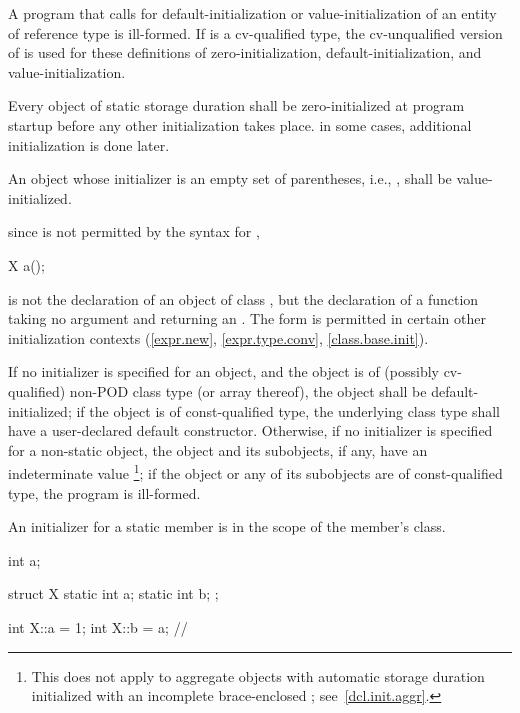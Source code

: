 A program that calls for default-initialization
or value-initialization
of an entity
of reference type is ill-formed.
If  is a cv-qualified type, the cv-unqualified version of
 is used for these definitions of zero-initialization,
default-initialization, and value-initialization.

\pnum
Every
object of static storage duration shall be
zero-initialized at program startup before any other initialization
takes place.
\enternote
in some cases, additional initialization is done later.
\exitnote

\pnum
An object whose initializer is an empty set of parentheses, i.e.,
\tcode{()},
shall be
value-initialized.

\pnum
{}%
\enternote
since
\tcode{()}
is not permitted by the syntax for
,

\begin{codeblock}
X a();
\end{codeblock}

is not the declaration of an object of class
,
but the declaration of a function taking no argument and returning an
.
The form
\tcode{()}
is permitted in certain other initialization contexts (\ref{expr.new},
\ref{expr.type.conv}, \ref{class.base.init}).
\exitnote

\pnum
If no initializer is specified for an object, and the object is of (possibly
cv-qualified) non-POD class type (or array thereof), the object shall be
default-initialized;
if the object is of const-qualified type, the underlying class type shall
have a user-declared default constructor.
Otherwise,
if no initializer is specified for a non-static object,
the object and its subobjects, if any, have an indeterminate value%
\footnote{This does not apply to aggregate objects with automatic storage
duration initialized with an incomplete brace-enclosed
; see~\ref{dcl.init.aggr}.};
if the object or any of its subobjects are of const-qualified type, the
program is ill-formed.

\pnum
{}%
An initializer for a static member is in the scope of the member's class.
\enterexample

\begin{codeblock}
int a;

struct X {
    static int a;
    static int b;
};

int X::a = 1;
int X::b = a;			// 
\end{codeblock}
\exitexampleb

